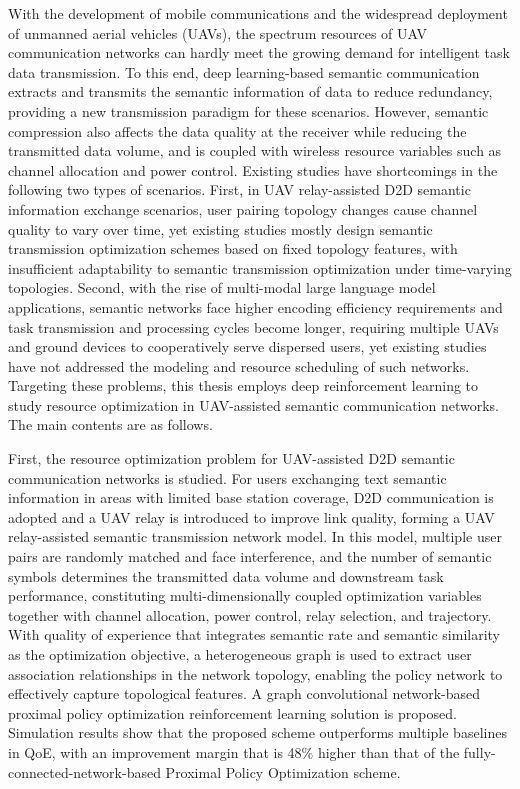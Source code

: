 
\begin{enabstract}
\linespread{1.33}\selectfont
With the development of mobile communications and the widespread deployment of unmanned aerial vehicles (UAVs), the spectrum resources of UAV communication networks can hardly meet the growing demand for intelligent task data transmission. To this end, deep learning-based semantic communication extracts and transmits the semantic information of data to reduce redundancy, providing a new transmission paradigm for these scenarios. However, semantic compression also affects the data quality at the receiver while reducing the transmitted data volume, and is coupled with wireless resource variables such as channel allocation and power control. Existing studies have shortcomings in the following two types of scenarios. First, in UAV relay-assisted D2D semantic information exchange scenarios, user pairing topology changes cause channel quality to vary over time, yet existing studies mostly design semantic transmission optimization schemes based on fixed topology features, with insufficient adaptability to semantic transmission optimization under time-varying topologies. Second, with the rise of multi-modal large language model applications, semantic networks face higher encoding efficiency requirements and task transmission and processing cycles become longer, requiring multiple UAVs and ground devices to cooperatively serve dispersed users, yet existing studies have not addressed the modeling and resource scheduling of such networks. Targeting these problems, this thesis employs deep reinforcement learning to study resource optimization in UAV-assisted semantic communication networks. The main contents are as follows.

First, the resource optimization problem for UAV-assisted D2D semantic communication networks is studied. For users exchanging text semantic information in areas with limited base station coverage, D2D communication is adopted and a UAV relay is introduced to improve link quality, forming a UAV relay-assisted semantic transmission network model. In this model, multiple user pairs are randomly matched and face interference, and the number of semantic symbols determines the transmitted data volume and downstream task performance, constituting multi-dimensionally coupled optimization variables together with channel allocation, power control, relay selection, and trajectory. With quality of experience that integrates semantic rate and semantic similarity as the optimization objective, a heterogeneous graph is used to extract user association relationships in the network topology, enabling the policy network to effectively capture topological features. A graph convolutional network-based proximal policy optimization reinforcement learning solution is proposed. Simulation results show that the proposed scheme outperforms multiple baselines in QoE, with an improvement margin that is 48\% higher than that of the fully-connected-network-based Proximal Policy Optimization scheme.


\end{enabstract}
